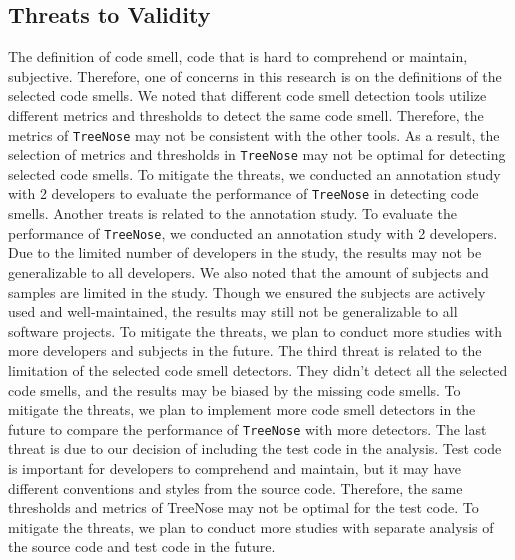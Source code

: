 




\subsection{Threats to Validity}
\label{sec:threats-to-validity}

The definition of code smell, code that is hard to comprehend or maintain, subjective. Therefore, one of concerns in this research is on the
definitions of the selected code smells. We noted that different code smell detection tools utilize 
different metrics and thresholds to detect the same code smell. Therefore, the metrics of \texttt{TreeNose} may not be consistent with the other tools.
As a result, the selection of metrics and thresholds in \texttt{TreeNose} may not be optimal for detecting selected code smells.
To mitigate the threats, we conducted an annotation study with 2 developers to evaluate the performance of \texttt{TreeNose} in detecting code smells.
Another treats is related to the annotation study. To evaluate the performance of \texttt{TreeNose},
we conducted an annotation study with 2 developers. Due to the limited number of developers in the study, the results may not be 
generalizable to all developers. We also noted that the amount of subjects and samples are limited in the study. Though we ensured the subjects are actively used and well-maintained, 
the results may still not be generalizable to all software projects. 
To mitigate the threats, we plan to conduct more studies with more developers and subjects in the future.
The third threat is related to the limitation of the selected code smell detectors. They didn't detect all the selected code smells,
and the results may be biased by the missing code smells. To mitigate the threats, 
we plan to implement more code smell detectors in the future to compare the performance of \texttt{TreeNose} with more detectors.
The last threat is due to our decision of including the test code in the analysis. Test code is important for developers to comprehend and maintain,
but it may have different conventions and styles from the source code. Therefore, the same thresholds and metrics of TreeNose may not be optimal for the test code.
To mitigate the threats, we plan to conduct more studies with separate analysis of the source code and test code in the future.


